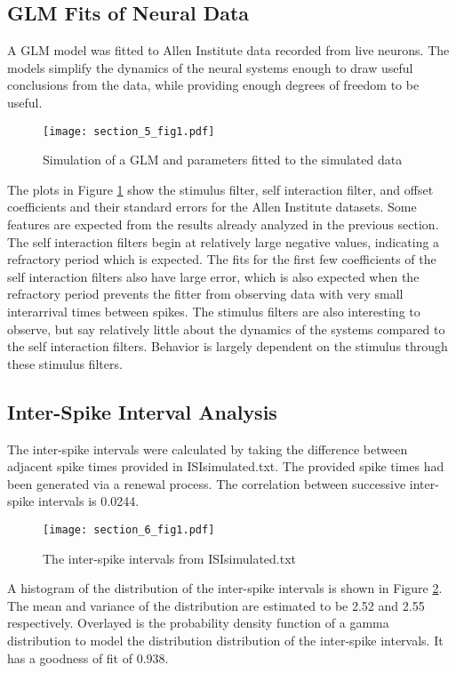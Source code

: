 \documentclass[letterpaper,titlepage,10pt]{article}
\begin{document}
\subsection{GLM Fits of Neural Data}

A GLM model was fitted to Allen Institute data recorded from live neurons. The models simplify the dynamics of the
neural systems enough to draw useful conclusions from the data, while providing enough degrees of freedom to be useful.

\begin{figure}[h]
\texttt{[image: section\_5\_fig1.pdf]}
\caption{Simulation of a GLM and parameters fitted to the simulated data}
\label{fig51}
\end{figure}

The plots in Figure \ref{fig51} show the stimulus filter, self interaction filter, and offset coefficients and their
standard errors for the Allen Institute datasets. Some features are expected from the results already analyzed in the
previous section. The self interaction filters begin at relatively large negative values, indicating a refractory
period which is expected. The fits for the first few coefficients of the self interaction filters also have large
error, which is also expected when the refractory period prevents the fitter from observing data with very small
interarrival times between spikes. The stimulus filters are also interesting to observe, but say relatively little
about the dynamics of the systems compared to the self interaction filters. Behavior is largely dependent on the
stimulus through these stimulus filters.

\subsection{Inter-Spike Interval Analysis}

The inter-spike intervals were calculated by taking the difference between adjacent spike times provided in
ISIsimulated.txt. The provided spike times had been generated via a renewal process. The correlation between
successive inter-spike intervals is 0.0244.

\begin{figure}[h]
\texttt{[image: section\_6\_fig1.pdf]}
\caption{The inter-spike intervals from ISIsimulated.txt}
\label{fig61}
\end{figure}

A histogram of the distribution of the inter-spike intervals is shown in Figure \ref{fig61}. The mean and variance of
the distribution are estimated to be 2.52 and 2.55 respectively. Overlayed is the probability density function of a
gamma distribution to model the distribution distribution of the inter-spike intervals. It has a goodness of fit of
0.938.
\end{document}
